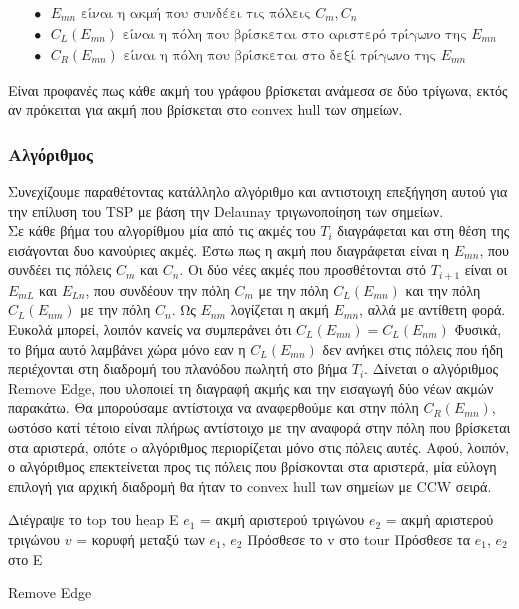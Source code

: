 \documentclass[oneside,12pt]{book}
\theoremstyle{definition}
\begin{document}
\begin{align*}
	& \bullet \text{ } E_{mn} \text{ είναι η ακμή που συνδέει τις πόλεις } C_m, C_n \\
	& \bullet \text{ } C_L(E_{mn}) \text{ είναι η πόλη που βρίσκεται στο αριστερό τρίγωνο της } E_{mn} \\
	& \bullet \text{ } C_R(E_{mn}) \text{ είναι η πόλη που βρίσκεται στο δεξί τρίγωνο της } E_{mn}
\end{align*}

Είναι προφανές πως κάθε ακμή του γράφου βρίσκεται ανάμεσα σε δύο τρίγωνα, εκτός αν πρόκειται για ακμή που βρίσκεται στο convex hull των σημείων. \\

\subsubsection{Αλγόριθμος}

Συνεχίζουμε παραθέτοντας κατάλληλο αλγόριθμο και αντιστοιχη επεξήγηση αυτού για την επίλυση του TSP με βάση την Delaunay τριγωνοποίηση των σημείων. \\

Σε κάθε βήμα του αλγορίθμου μία από τις ακμές του \(T_i\) διαγράφεται και στη θέση της εισάγονται δυο κανούριες ακμές. Έστω πως η ακμή που διαγράφεται είναι η \(E_{mn}\), που συνδέει τις πόλεις \(C_m\) και \(C_n\). Οι δύο νέες ακμές που προσθέτονται στό \(Τ_{i+1}\) είναι οι \(E_{mL}\) και \(E_{Ln}\), που συνδέουν την πόλη \(C_m\) με την πόλη \(C_L(E_{mn})\) και την πόλη \(C_L(E_{nm})\) με την πόλη \(C_n\). Ως \(E_{nm}\) λογίζεται η ακμή \(E_{mn}\), αλλά με αντίθετη φορά. Ευκολά μπορεί, λοιπόν κανείς να συμπεράνει ότι \(C_L(E_{mn}) = C_L(E_{nm})\) Φυσικά, το βήμα αυτό λαμβάνει χώρα μόνο εαν η \(C_L(E_{mn})\) δεν ανήκει στις πόλεις που ήδη περιέχονται στη διαδρομή του πλανόδου πωλητή στο βήμα \(T_i\). Δίνεται ο αλγόριθμος Remove Edge, που υλοποιεί τη διαγραφή ακμής και την εισαγωγή δύο νέων ακμών παρακάτω. Θα μπορούσαμε αντίστοιχα να αναφερθούμε και στην πόλη \(C_R(E_{mn})\), ωστόσο κατί τέτοιο είναι πλήρως αντίστοιχο με την αναφορά στην πόλη που βρίσκεται στα αριστερά, οπότε o αλγόριθμος περιορίζεται μόνο στις πόλεις αυτές. Αφού, λοιπόν, ο αλγόριθμος επεκτείνεται προς τις πόλεις που βρίσκονται στα αριστερά, μία εύλογη επιλογή για αρχική διαδρομή θα ήταν το convex hull των σημείων με CCW σειρά. \\

\begin{algorithm}[H]
	\SetAlgoLined
	
	Διέγραψε το top του heap Ε \;
	\(e_1\) = ακμή αριστερού τριγώνου \;
	\(e_2\) = ακμή αριστερού τριγώνου \;	
	\(v\) = κορυφή μεταξύ των \(e_1\), \(e_2\) \;
	Πρόσθεσε το v στο tour \;
	Πρόσθεσε τα \(e_1\), \(e_2\) στο Ε \;
	
	\caption{Remove Edge}
\end{algorithm}
\end{document}

